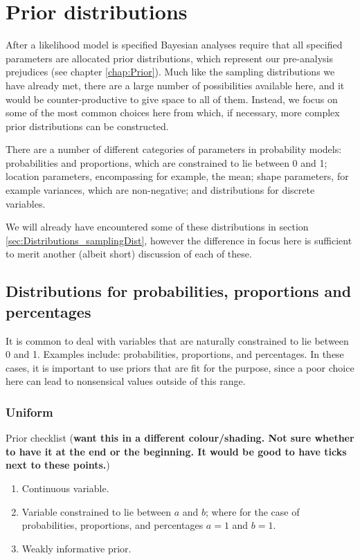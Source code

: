 \documentclass[11pt,fullpage]{book}
\begin{document}
\section{Prior distributions}
After a likelihood model is specified Bayesian analyses require that all specified parameters are allocated prior distributions, which represent our pre-analysis prejudices (see chapter \ref{chap:Prior}). Much like the sampling distributions we have already met, there are a large number of possibilities available here, and it would be counter-productive to give space to all of them. Instead, we focus on some of the most common choices here from which, if necessary, more complex prior distributions can be constructed. 

There are a number of different categories of parameters in probability models: probabilities and proportions, which are constrained to lie between 0 and 1; location parameters, encompassing for example, the mean; shape parameters, for example variances, which are non-negative; and distributions for discrete variables. 

We will already have encountered some of these distributions in section \ref{sec:Distributions_samplingDist}, however the difference in focus here is sufficient to merit another (albeit short) discussion of each of these.


\subsection{Distributions for probabilities, proportions and percentages}
It is common to deal with variables that are naturally constrained to lie between 0 and 1. Examples include: probabilities, proportions, and percentages. In these cases, it is important to use priors that are fit for the purpose, since a poor choice here can lead to nonsensical values outside of this range.

\subsubsection{Uniform}
Prior checklist (\textbf{want this in a different colour/shading. Not sure whether to have it at the end or the beginning. It would be good to have ticks next to these points.})

\begin{enumerate} 
\item Continuous variable.
\item Variable constrained to lie between $a$ and $b$; where for the case of probabilities, proportions, and percentages $a=1$ and $b=1$.
\item Weakly informative prior.
\end{enumerate}
\end{document}
